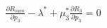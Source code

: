 \documentclass[preview]{standalone}
\begin{document}
\begin{align*}
\frac{\partial {R_{sum}}}{\partial {p_3}} - \lambda^\ast + \mu_3^\ast \frac{\partial {R_3}}{\partial {p_3}} = 0
\end{align*}
\end{document}
